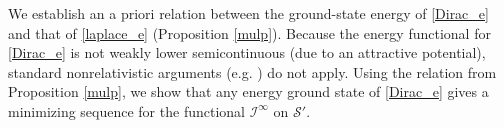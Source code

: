 \documentclass{amsart}
\theoremstyle{plain}
\theoremstyle{definition}
\theoremstyle{remark}
\numberwithin{equation}{section} \numberwithin{figure}{section}
\begin{document}
  We establish an a priori relation between the ground-state energy of \eqref{Dirac_e} and that of \eqref{laplace_e} (Proposition \ref{mulp}). Because the energy functional for \eqref{Dirac_e} is not weakly lower semicontinuous (due to an attractive potential), standard nonrelativistic arguments (e.g. \cite{ES01}) do not apply. Using the relation from Proposition \ref{mulp}, we show that any energy ground state of \eqref{Dirac_e} gives a minimizing sequence for the functional \(\mathcal{I}^\infty\) on \(\mathcal{S}'\).  
  
\end{document}
